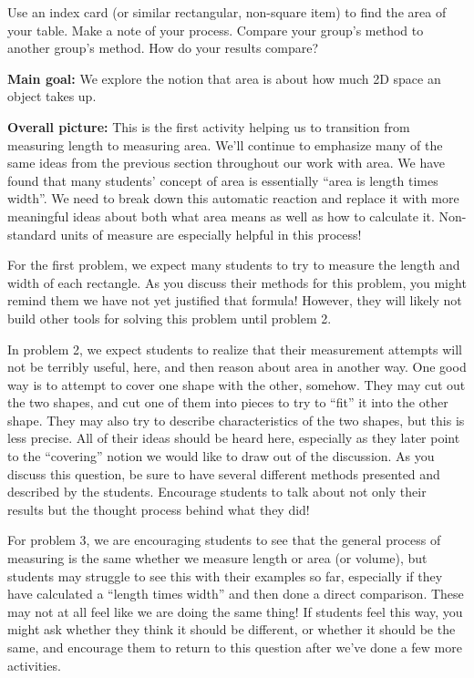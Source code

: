 \documentclass[nooutcomes,noauthor, handout]{ximera}
\begin{document}
\begin{problem}
Use an index card (or similar rectangular, non-square item) to find the area of your table.  Make a note of your process.  Compare your group's method to another group's method.  How do your results compare?

\end{problem}



\pagebreak


\begin{instructorNotes}
{\bf Main goal:} We explore the notion that area is about how much 2D space an object takes up.

{\bf Overall picture:}
This is the first activity helping us to transition from measuring length to measuring area. We'll continue to emphasize many of the same ideas from the previous section throughout our work with area. We have found that many students' concept of area is essentially ``area is length times width''. We need to break down this automatic reaction and replace it with more meaningful ideas about both what area means as well as how to calculate it. Non-standard units of measure are especially helpful in this process!

For the first problem, we expect many students to try to measure the length and width of each rectangle. As you discuss their methods for this problem, you might remind them we have not yet justified that formula! However, they will likely not build other tools for solving this problem until problem 2.

In problem 2, we expect students to realize that their measurement attempts will not be terribly useful, here, and then reason about area in another way.  One good way is to attempt to cover one shape with the other, somehow. They may cut out the two shapes, and cut one of them into pieces to try to ``fit'' it into the other shape. They may also try to describe characteristics of the two shapes, but this is less precise. All of their ideas should be heard here, especially as they later point to the ``covering'' notion we would like to draw out of the discussion. As you discuss this question, be sure to have several different methods presented and described by the students. Encourage students to talk about not only their results but the thought process behind what they did!

For problem 3, we are encouraging students to see that the general process of measuring is the same whether we measure length or area (or volume), but students may struggle to see this with their examples so far, especially if they have calculated a ``length times width'' and then done a direct comparison. These may not at all feel like we are doing the same thing! If students feel this way, you might ask whether they think it should be different, or whether it should be the same, and encourage them to return to this question after we've done a few more activities.


\end{instructorNotes}
\end{document}
